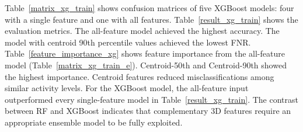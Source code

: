 Table~\ref{matrix_xg_train} shows confusion matrices of five XGBoost models: four with a single feature and one with all features.
Table~\ref{result_xg_train} shows the evaluation metrics.
The all-feature model achieved the highest accuracy.
The model with centroid 90th percentile values achieved the lowest FNR.
Table~\ref{feature_importance_xg} shows feature importance from the all-feature model (Table~\ref{matrix_xg_train_e}).
Centroid-50th and Centroid-90th showed the highest importance.
Centroid features reduced misclassifications among similar activity levels.
For the XGBoost model, the all-feature input outperformed every single-feature model in Table~\ref{result_xg_train}.
The contrast between RF and XGBoost indicates that complementary 3D features require an appropriate ensemble model to be fully exploited.
